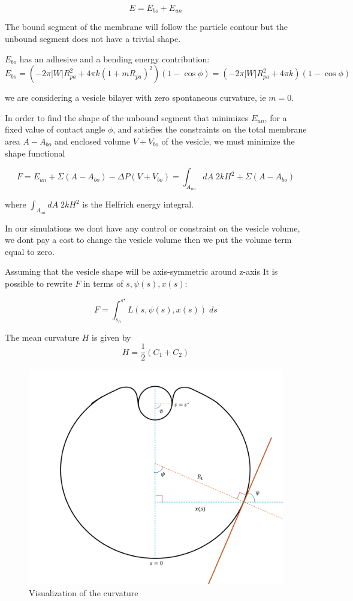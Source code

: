 \documentclass[12pt]{article}
\begin{document}
$$
E = E_{bo} + E_{un}
$$

The bound segment of the membrane will follow the particle contour but the unbound segment does not have a trivial shape.

$E_{bo}$ has an adhesive and a bending energy contribution: \cite{agudo-canalejoCriticalParticleSizes2015}
$$
E_{bo} = (-2 \pi |W| R_{pa}^2 + 4 \pi k(1+m R_{pa})^2)(1-\cos \phi) = (-2 \pi |W| R_{pa}^2 + 4 \pi k)(1-\cos \phi)
$$

we are considering a vesicle bilayer with zero spontaneous curvature, ie $m=0$.


In order to find the shape of the unbound segment that minimizes $E_{un}$, for a fixed value of contact angle $\phi$, and satisfies the constraints on the total membrane area $A-A_{bo}$ and enclosed volume $V+V_{bo}$ of the vesicle, we must minimize the shape functional


$$
F = E_{un} + \Sigma(A-A_{bo}) - \Delta P (V+V_{bo}) = \int_{A_{un}} dA \; 2kH^2  + \Sigma(A-A_{bo})
$$

where $\int_{A_{un}} dA \; 2kH^2$ is the Helfrich energy integral.

In our simulations we dont have any control or constraint on the vesicle volume, we dont pay a cost to change the vesicle volume then we put the volume term equal to zero.


Assuming that the vesicle shape will be axis-symmetric around z-axis It is possible to rewrite $F$ in terms of $s,\psi(s),x(s)$:

$$
F = \int_{s_0}^{s^\star} L(s,\psi(s),x(s)) \; ds
$$


The mean curvature $H$ is given by 
$$H=\frac{1}{2}(C_1+C_2)$$

\begin{figure}[ht]
  \begin{center}
      \includegraphics[width=0.8\linewidth]{img/shape_equation_schematic.png}
      \caption{Visualization of the curvature}
  \end{center}
  \label{fig:figure2}
\end{figure}
\end{document}
